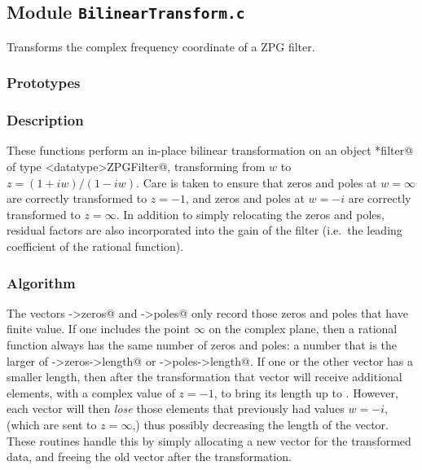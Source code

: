 
\subsection{Module \texttt{BilinearTransform.c}}

Transforms the complex frequency coordinate of a ZPG filter.

\subsubsection{Prototypes}
\vspace{0.1in}


\subsubsection{Description}

These functions perform an in-place bilinear transformation on an
object \verb@*filter@ of type \verb@<datatype>ZPGFilter@, transforming
from $w$ to $z=(1+iw)/(1-iw)$.  Care is taken to ensure that zeros and
poles at $w=\infty$ are correctly transformed to $z=-1$, and zeros and
poles at $w=-i$ are correctly transformed to $z=\infty$.  In addition
to simply relocating the zeros and poles, residual factors are also
incorporated into the gain of the filter (i.e.\ the leading
coefficient of the rational function).

\subsubsection{Algorithm}

The vectors \verb@filter->zeros@ and \verb@filter->poles@ only record
those zeros and poles that have finite value.  If one includes the
point $\infty$ on the complex plane, then a rational function always
has the same number of zeros and poles: a number \verb@num@ that is
the larger of \verb@z->zeros->length@ or \verb@z->poles->length@.  If
one or the other vector has a smaller length, then after the
transformation that vector will receive additional elements, with a
complex value of $z=-1$, to bring its length up to \verb@num@.
However, each vector will then \emph{lose} those elements that
previously had values $w=-i$, (which are sent to $z=\infty$,) thus
possibly decreasing the length of the vector.  These routines handle
this by simply allocating a new vector for the transformed data, and
freeing the old vector after the transformation.

